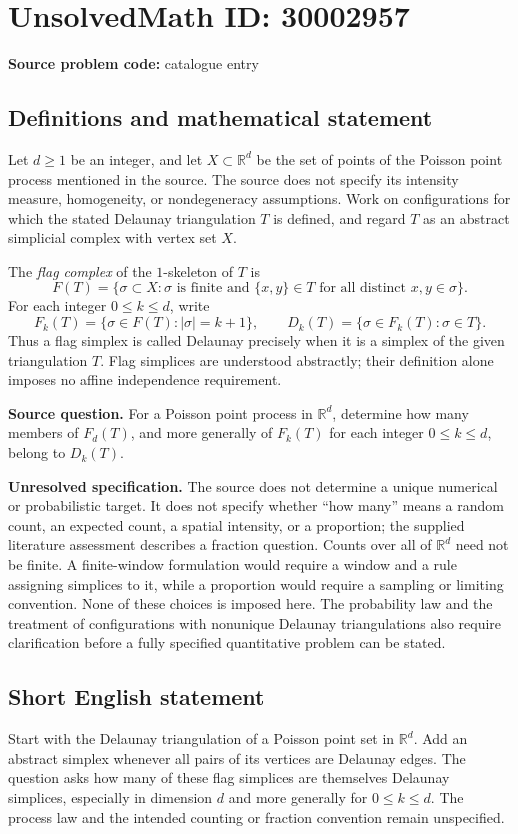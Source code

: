 \documentclass[11pt]{article}
\newcommand{\R}{\mathbb{R}}
\begin{document}
\section*{UnsolvedMath ID: 30002957}
\textbf{Source problem code:} catalogue entry
\subsection{Definitions and mathematical statement}
Let \(d\geq 1\) be an integer, and let \(X\subset\R^d\) be the set of points of the Poisson point process mentioned in the source. The source does not specify its intensity measure, homogeneity, or nondegeneracy assumptions. Work on configurations for which the stated Delaunay triangulation \(T\) is defined, and regard \(T\) as an abstract simplicial complex with vertex set \(X\).

The \emph{flag complex} of the \(1\)-skeleton of \(T\) is
\[
F(T)=\bigl\{\sigma\subset X: \sigma\text{ is finite and }\{x,y\}\in T\text{ for all distinct }x,y\in\sigma\bigr\}.
\]
For each integer \(0\leq k\leq d\), write
\[
F_k(T)=\{\sigma\in F(T):|\sigma|=k+1\},\qquad
D_k(T)=\{\sigma\in F_k(T):\sigma\in T\}.
\]
Thus a flag simplex is called Delaunay precisely when it is a simplex of the given triangulation \(T\). Flag simplices are understood abstractly; their definition alone imposes no affine independence requirement.

\textbf{Source question.} For a Poisson point process in \(\R^d\), determine how many members of \(F_d(T)\), and more generally of \(F_k(T)\) for each integer \(0\leq k\leq d\), belong to \(D_k(T)\).

\textbf{Unresolved specification.} The source does not determine a unique numerical or probabilistic target. It does not specify whether ``how many'' means a random count, an expected count, a spatial intensity, or a proportion; the supplied literature assessment describes a fraction question. Counts over all of \(\R^d\) need not be finite. A finite-window formulation would require a window and a rule assigning simplices to it, while a proportion would require a sampling or limiting convention. None of these choices is imposed here. The probability law and the treatment of configurations with nonunique Delaunay triangulations also require clarification before a fully specified quantitative problem can be stated.
\subsection{Short English statement}
Start with the Delaunay triangulation of a Poisson point set in \(\R^d\). Add an abstract simplex whenever all pairs of its vertices are Delaunay edges. The question asks how many of these flag simplices are themselves Delaunay simplices, especially in dimension \(d\) and more generally for \(0\leq k\leq d\). The process law and the intended counting or fraction convention remain unspecified.
\end{document}
